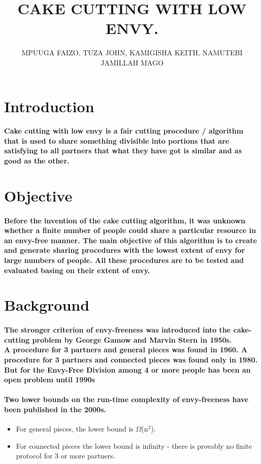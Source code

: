 \documentclass[12pt]{report}
\title{\textbf{CAKE CUTTING WITH LOW ENVY.}}
\author{MPUUGA FAIZO, TUZA JOHN, KAMIGISHA KEITH, NAMUTEBI JAMILLAH MAGO}
\begin{document}
\maketitle
	\section{Introduction} 
	\paragraph{Cake cutting with low envy is a fair cutting procedure / algorithm that is used to share something divisible into portions that are satisfying to all partners that what they have got is similar and as good as the other. }
	
		\section{Objective}
		\paragraph{Before the invention of the cake cutting algorithm, it was unknown whether a finite number of people could share a particular resource in an envy-free manner. The main objective of this algorithm is to create and generate sharing procedures with the lowest extent of envy for large numbers of people. All these procedures are to be tested and evaluated basing on their extent of envy.  }
		
	\section{Background}
	\paragraph{The stronger criterion of envy-freeness was introduced into the cake-cutting problem by George Gamow and Marvin Stern in 1950s.\\
		A procedure for 3 partners and general pieces was found in 1960. A procedure for 3 partners and connected pieces was found only in 1980.\\
		But for the Envy-Free Division among 4 or more people has been an open problem until 1990s}
	\paragraph{Two lower bounds on the run-time complexity of envy-freeness have been published in the 2000s.}
	\begin{itemize}
		\item For general pieces, the lower bound is $\Omega$(n$^{2}$).
		\item For connected pieces the lower bound is infinity - there is provably no finite protocol for 3 or more partners.
	\end{itemize}
\end{document}
